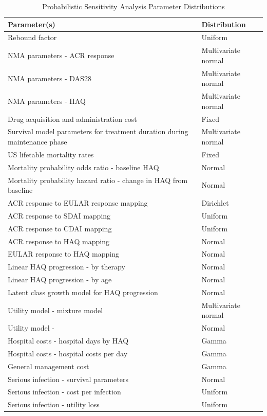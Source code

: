 \documentclass[11pt,final,fleqn]{article}\usepackage[]{graphicx}\usepackage[]{color}
\theoremstyle{plain}
\begin{document}
\begin{table}[!ht] 
\begin{center}
\begin{threeparttable}
\caption{Probabilistic Sensitivity Analysis Parameter Distributions} \label{tbl:psa-dists}
\def\arraystretch{1.5}
\begin{tabularx}{\textwidth}{@{\extracolsep{\fill}}p{.65 \linewidth}p{.35 \linewidth}}
\hline
\multicolumn{1}{l}{Parameter(s)} & \multicolumn{1}{l}{Distribution} \\
\hline
Rebound factor & Uniform\\
NMA parameters - ACR response & Multivariate normal \\
NMA parameters - DAS28 & Multivariate normal \\
NMA parameters - HAQ & Multivariate normal \\
Drug acquisition and administration cost & Fixed \\
Survival model parameters for treatment duration during maintenance phase & Multivariate normal \\
US lifetable mortality rates & Fixed \\
Mortality probability odds ratio - baseline HAQ & Normal \\
Mortality probability hazard ratio - change in HAQ from baseline & Normal\\
ACR response to EULAR response mapping & Dirichlet \\
ACR response to SDAI mapping & Uniform \\
ACR response to CDAI mapping & Uniform \\
ACR response to HAQ mapping & Normal \\
EULAR response to HAQ mapping & Normal \\
Linear HAQ progression - by therapy & Normal \\
Linear HAQ progression - by age & Normal \\
Latent class growth model for HAQ progression & Normal \\
Utility model - \cite{alava2013relationship} mixture model & Multivariate normal \\
Utility model - \citet{wailoo2006modeling} & Normal \\
Hospital costs - hospital days by HAQ & Gamma \\
Hospital costs - hospital costs per day & Gamma \\
General management cost & Gamma \\
Serious infection - survival parameters & Normal \\
Serious infection - cost per infection & Uniform \\
Serious infection - utility loss & Uniform \\
\hline
\end{tabularx}
\scriptsize
\end{threeparttable}
\end{center}
\end{table}
\end{document}
